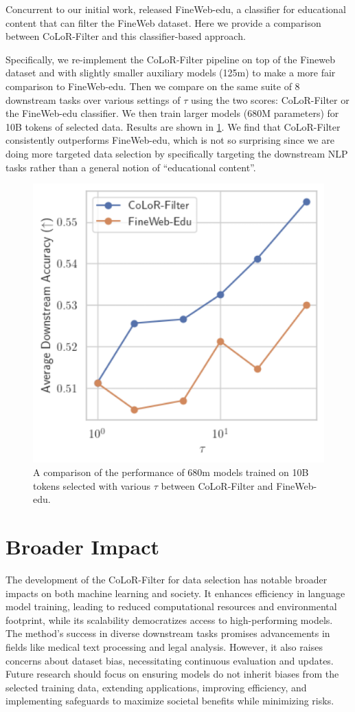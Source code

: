 \documentclass{article}
\begin{document}
Concurrent to our initial work, \citet{penedo2024fineweb} released FineWeb-edu, a classifier for educational content that can filter the FineWeb dataset. Here we provide a comparison between CoLoR-Filter and this classifier-based approach.

Specifically, we re-implement the CoLoR-Filter pipeline on top of the Fineweb dataset and with slightly smaller auxiliary models (125m) to make a more fair comparison to FineWeb-edu. Then we compare on the same suite of 8 downstream tasks over various settings of $ \tau$ using the two scores: CoLoR-Filter or the FineWeb-edu classifier. We then train larger models (680M parameters) for 10B tokens of selected data. Results are shown in \cref{fig:fineweb}. We find that CoLoR-Filter consistently outperforms FineWeb-edu, which is not so surprising since we are doing more targeted data selection by specifically targeting the downstream NLP tasks rather than a general notion of ``educational content''.


\begin{figure}[h]
    \centering
    \includegraphics[width=0.3\linewidth]{images/fineweb.png}
    \caption{A comparison of the performance of 680m models trained on 10B tokens selected with various $\tau$ between CoLoR-Filter and FineWeb-edu.}
    \label{fig:fineweb}
\end{figure}




\section{Broader Impact}\label{sec:broader}
The development of the CoLoR-Filter for data selection has notable broader impacts on both machine learning and society. It enhances efficiency in language model training, leading to reduced computational resources and environmental footprint, while its scalability democratizes access to high-performing models. The method's success in diverse downstream tasks promises advancements in fields like medical text processing and legal analysis. However, it also raises concerns about dataset bias, necessitating continuous evaluation and updates. Future research should focus on ensuring models do not inherit biases from the selected training data, extending applications, improving efficiency, and implementing safeguards to maximize societal benefits while minimizing risks.
\end{document}
